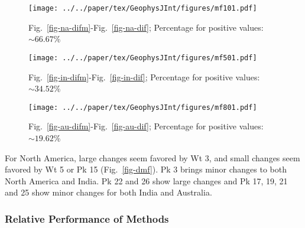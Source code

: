 \begin{figure*}
	\centering
	\begin{subfigure}{1.01\textwidth}
		\texttt{[image: ../../paper/tex/GeophysJInt/figures/mf101.pdf]}
		\caption{Fig.~\ref{fig-na-difm}-Fig.~\ref{fig-na-dif}; Percentage for
		positive values: ${\sim}66.67$\%}\label{fig-mf101}
	\end{subfigure}
	\vspace{.1em}
	\begin{subfigure}{1.01\textwidth}
		\texttt{[image: ../../paper/tex/GeophysJInt/figures/mf501.pdf]}
		\caption{Fig.~\ref{fig-in-difm}-Fig.~\ref{fig-in-dif}; Percentage for
		positive values: ${\sim}34.52$\%}\label{fig-mf501}
	\end{subfigure}
	\vspace{.1em}
	\begin{subfigure}{1.01\textwidth}
		\texttt{[image: ../../paper/tex/GeophysJInt/figures/mf801.pdf]}
		\caption{Fig.~\ref{fig-au-difm}-Fig.~\ref{fig-au-dif}; Percentage for
		positive values: ${\sim}19.62$\%}\label{fig-mf801}
	\end{subfigure}
	\caption[Differences between results from FHM and MHM]{Differences between
results from two different reference paths, FHM (Fig.~\ref{fig-dif}) and MHM
(Fig.~\ref{fig-difm}) derived. The absolute difference values less than
1.96-standard-deviation interval of the whole 168 values are labeled in green,
more than 1.96-standard-deviation interval labeled in red.}\label{fig-dmf}
\end{figure*}

For North America, large changes seem favored by Wt 3, and small changes seem
favored by Wt 5 or Pk 15 (Fig.~\ref{fig-dmf}). Pk 3 brings minor changes to both
North America and India. Pk 22 and 26 show large changes and Pk 17, 19, 21 and
25 show minor changes for both India and Australia.

\subsubsection{Relative Performance of Methods}

